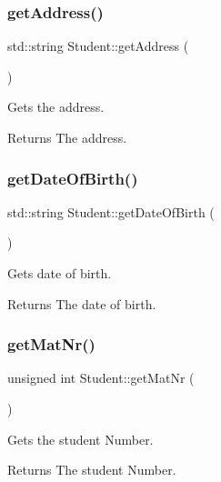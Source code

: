 \subsubsection{\texorpdfstring{get\+Address()}{getAddress()}}
{\footnotesize\ttfamily std\+::string Student\+::get\+Address (\begin{DoxyParamCaption}{ }\end{DoxyParamCaption})}



Gets the address. 

\begin{DoxyReturn}{Returns}
The address. 
\end{DoxyReturn}
\mbox{\label{class_student_a9c46502480d94c46865eee494f96bfe0}} 
\subsubsection{\texorpdfstring{get\+Date\+Of\+Birth()}{getDateOfBirth()}}
{\footnotesize\ttfamily std\+::string Student\+::get\+Date\+Of\+Birth (\begin{DoxyParamCaption}{ }\end{DoxyParamCaption})}



Gets date of birth. 

\begin{DoxyReturn}{Returns}
The date of birth. 
\end{DoxyReturn}
\mbox{\label{class_student_a2f996798d6c9b904e3abf902f68d3c0b}} 
\subsubsection{\texorpdfstring{get\+Mat\+Nr()}{getMatNr()}}
{\footnotesize\ttfamily unsigned int Student\+::get\+Mat\+Nr (\begin{DoxyParamCaption}{ }\end{DoxyParamCaption})}



Gets the student Number. 

\begin{DoxyReturn}{Returns}
The student Number. 
\end{DoxyReturn}
\mbox{\label{class_student_a729c900a0e95c46f90668f527a72ad34}} 
